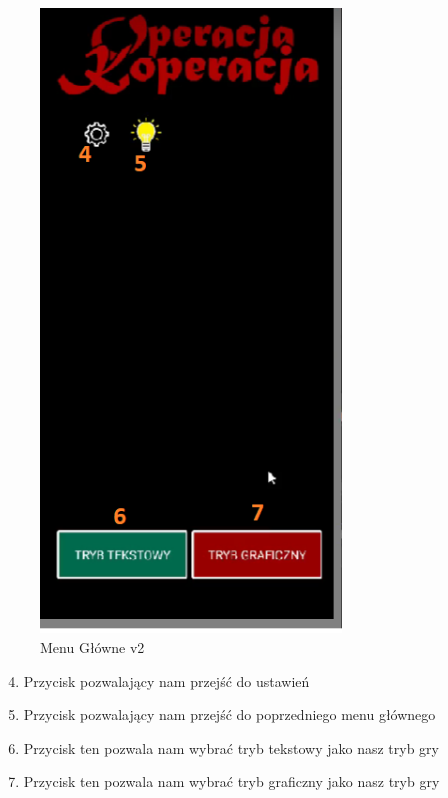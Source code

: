 	\begin{figure}[!htb]
	\begin{center}
		\includegraphics[width=8cm]{rys/opis3.png}
		\caption{Menu Główne v2}
		\label{rys:rysunek001}
	\end{center}
\end{figure}


\begin{enumerate}
	\setcounter{enumi}{3}
	\item Przycisk pozwalający nam przejść do ustawień 
	\item Przycisk pozwalający nam przejść do poprzedniego menu głównego
	\item Przycisk ten pozwala nam wybrać tryb tekstowy jako nasz tryb gry
	\item Przycisk ten pozwala nam wybrać tryb graficzny jako nasz tryb gry
\end{enumerate}


